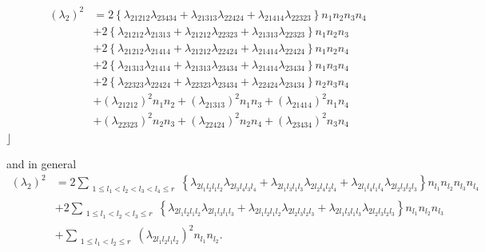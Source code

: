 \documentclass[aps,preprint]{revtex4}%
\begin{document}
\begin{align}
\left(  \lambda_{2}\right)  ^{2}  &  =2\left\{  \lambda_{21212}\lambda
_{23434}+\lambda_{21313}\lambda_{22424}+\lambda_{21414}\lambda_{22323}%
\right\}  n_{1}n_{2}n_{3}n_{4}\nonumber\\
&  +2\left\{  \lambda_{21212}\lambda_{21313}+\lambda_{21212}\lambda
_{22323}+\lambda_{21313}\lambda_{22323}\right\}  n_{1}n_{2}n_{3}\nonumber\\
&  +2\left\{  \lambda_{21212}\lambda_{21414}+\lambda_{21212}\lambda
_{22424}+\lambda_{21414}\lambda_{22424}\right\}  n_{1}n_{2}n_{4}\nonumber\\
&  +2\left\{  \lambda_{21313}\lambda_{21414}+\lambda_{21313}\lambda
_{23434}+\lambda_{21414}\lambda_{23434}\right\}  n_{1}n_{3}n_{4}\nonumber\\
&  +2\left\{  \lambda_{22323}\lambda_{22424}+\lambda_{22323}\lambda
_{23434}+\lambda_{22424}\lambda_{23434}\right\}  n_{2}n_{3}n_{4}\nonumber\\
&  +\left(  \lambda_{21212}\right)  ^{2}n_{1}n_{2}+\left(  \lambda
_{21313}\right)  ^{2}n_{1}n_{3}+\left(  \lambda_{21414}\right)  ^{2}n_{1}%
n_{4}\nonumber\\
&  +\left(  \lambda_{22323}\right)  ^{2}n_{2}n_{3}+\left(  \lambda
_{22424}\right)  ^{2}n_{2}n_{4}+\left(  \lambda_{23434}\right)  ^{2}n_{3}n_{4}
\label{lamdasquared}%
\end{align}
$\rfloor$

and in general
\begin{align}
\left(  \lambda_{2}\right)  ^{2}  &  =2\sum_{\substack{1\leq l_{1}<l_{2}%
<l_{3}<l_{4}\leq r}}\left\{  \lambda_{2l_{1}l_{2}l_{1}l_{2}}\lambda
_{2l_{3}l_{4}l_{3}l_{4}}+\lambda_{2l_{1}l_{3}l_{1}l_{3}}\lambda_{2l_{2}%
l_{4}l_{2}l_{4}}+\lambda_{2l_{1}l_{4}l_{1}l_{4}}\lambda_{2l_{2}l_{3}l_{2}%
l_{3}}\right\}  n_{l_{1}}n_{l_{2}}n_{l_{3}}n_{l_{4}}\nonumber\\
&  +2\sum_{\substack{1\leq l_{1}<l_{2}<l_{3}\leq r}}\left\{  \lambda
_{2l_{1}l_{2}l_{1}l_{2}}\lambda_{2l_{1}l_{3}l_{1}l_{3}}+\lambda_{2l_{1}%
l_{2}l_{1}l_{2}}\lambda_{2l_{2}l_{3}l_{2}l_{3}}+\lambda_{2l_{1}l_{3}l_{1}%
l_{3}}\lambda_{2l_{2}l_{3}l_{2}l_{3}}\right\}  n_{l_{1}}n_{l_{2}}n_{l_{3}%
}\nonumber\\
&  +\sum_{\substack{1\leq l_{1}<l_{2}\leq r}}\left(  \lambda_{2l_{1}l_{2}%
l_{1}l_{2}}\right)  ^{2}n_{l_{1}}n_{l_{2}}.\nonumber
\end{align}
\end{document}
